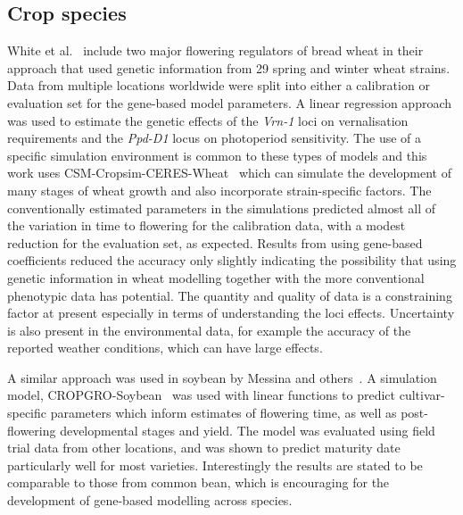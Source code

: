 \subsection{Crop species}
\label{sec:cropModelLit}
White et al.~\cite{white2008} include two major flowering regulators of bread wheat in their approach that used genetic information from 29 spring and winter wheat strains.
Data from multiple locations worldwide were split into either a calibration or evaluation set for the gene-based model parameters.
A linear regression approach was used to estimate the genetic effects of the \emph{Vrn-1} loci on vernalisation requirements and the \emph{Ppd-D1} locus on photoperiod sensitivity.
The use of a specific simulation environment is common to these types of models and this work uses CSM-Cropsim-CERES-Wheat~\cite{jones2003} which can simulate the development of many stages of wheat growth and also incorporate strain-specific factors.
The conventionally estimated parameters in the simulations predicted almost all of the variation in time to flowering for the calibration data, with a modest reduction for the evaluation set, as expected.
Results from using gene-based coefficients reduced the accuracy only slightly indicating the possibility that using genetic information in wheat modelling together with the more conventional phenotypic data has potential.
The quantity and quality of data is a constraining factor at present especially in terms of understanding the loci effects.
Uncertainty is also present in the environmental data, for example the accuracy of the reported weather conditions, which can have large effects.

A similar approach was used in soybean by Messina and others~\cite{messina2006}.
A simulation model, CROPGRO-Soybean~\cite{boote1998} was used with linear functions to predict cultivar-specific parameters which inform estimates of flowering time, as well as post-flowering developmental stages and yield.
The model was evaluated using field trial data from other locations, and was shown to predict maturity date particularly well for most varieties.
Interestingly the results are stated to be comparable to those from common bean, which is encouraging for the development of gene-based modelling across species.

